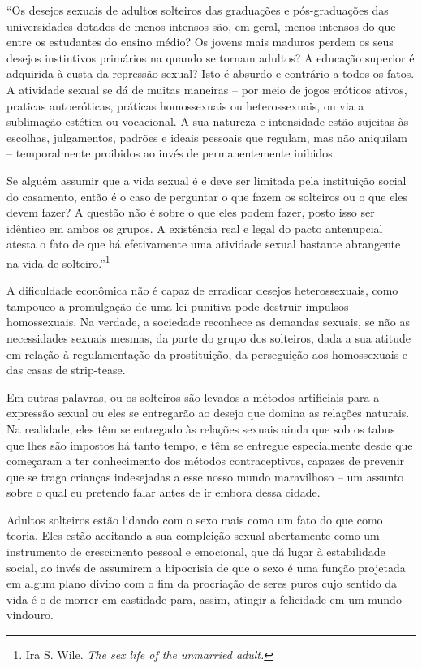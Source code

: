 ``Os desejos sexuais de adultos solteiros das graduações e
pós-graduações das universidades dotados de menos intensos são, em
geral, menos intensos do que entre os estudantes do ensino médio? Os
jovens mais maduros perdem os seus desejos instintivos primários na
quando se tornam adultos? A educação superior é adquirida à custa da
repressão sexual? Isto é absurdo e contrário a todos os fatos. A
atividade sexual se dá de muitas maneiras -- por meio de jogos eróticos
ativos, praticas autoeróticas, práticas homossexuais ou heterossexuais,
ou via a sublimação estética ou vocacional. A sua natureza e intensidade
estão sujeitas às escolhas, julgamentos, padrões e ideais pessoais que
regulam, mas não aniquilam -- temporalmente proibidos ao invés de
permanentemente inibidos.

Se alguém assumir que a vida sexual é e deve ser limitada pela
instituição social do casamento, então é o caso de perguntar o que fazem
os solteiros ou o que eles devem fazer? A questão não é sobre o que eles
podem fazer, posto isso ser idêntico em ambos os grupos. A existência
real e legal do pacto antenupcial atesta o fato de que há efetivamente
uma atividade sexual bastante abrangente na vida de
solteiro.''\footnote{Ira S. Wile. \emph{The sex life of the unmarried
  adult.}}

\asterisc

A dificuldade econômica não é capaz de erradicar desejos heterossexuais,
como tampouco a promulgação de uma lei punitiva pode destruir impulsos
homossexuais. Na verdade, a sociedade reconhece as demandas sexuais, se
não as necessidades sexuais mesmas, da parte do grupo dos solteiros,
dada a sua atitude em relação à regulamentação da prostituição, da
perseguição aos homossexuais e das casas de strip-tease.

Em outras palavras, ou os solteiros são levados a métodos artificiais
para a expressão sexual ou eles se entregarão ao desejo que domina as
relações naturais. Na realidade, eles têm se entregado às relações
sexuais ainda que sob os tabus que lhes são impostos há tanto tempo, e
têm se entregue especialmente desde que começaram a ter conhecimento dos
métodos contraceptivos, capazes de prevenir que se traga crianças
indesejadas a esse nosso mundo maravilhoso -- um assunto sobre o qual eu
pretendo falar antes de ir embora dessa cidade.

Adultos solteiros estão lidando com o sexo mais como um fato do que como
teoria. Eles estão aceitando a sua compleição sexual abertamente como um
instrumento de crescimento pessoal e emocional, que dá lugar à
estabilidade social, ao invés de assumirem a hipocrisia de que o sexo é
uma função projetada em algum plano divino com o fim da procriação de
seres puros cujo sentido da vida é o de morrer em castidade para, assim,
atingir a felicidade em um mundo vindouro.

